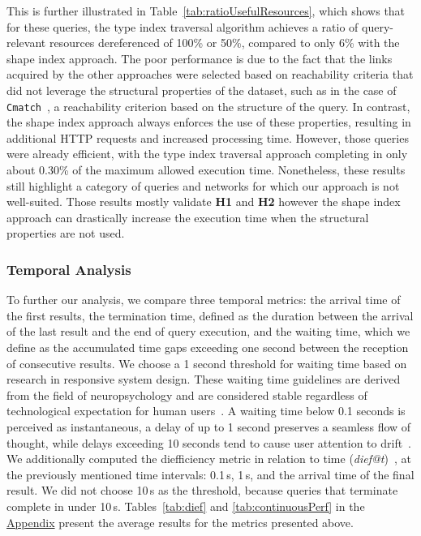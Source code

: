 This is further illustrated in Table~\ref{tab:ratioUsefulResources}, which shows that for these queries, the type index traversal algorithm achieves a ratio of query-relevant resources dereferenced of 100\% or 50\%, compared to only 6\% with the shape index approach.
The poor performance is due to the fact that the links acquired by the other approaches were selected based on reachability criteria that did not leverage the structural properties of the dataset, such as in the case of \texttt{Cmatch}~\cite{hartig2016walking}, a reachability criterion based on the structure of the query.
In contrast, the shape index approach always enforces the use of these properties, resulting in additional HTTP requests and increased processing time.
However, those queries were already efficient, with the type index traversal approach completing in only about 0.30\% of the maximum allowed execution time.
Nonetheless, these results still highlight a category of queries and networks for which our approach is not well-suited.
Those results mostly validate \textbf{H1} and \textbf{H2} however the shape index approach can drastically increase the execution time when the structural properties are not used.

 

\subsubsection{Temporal Analysis}
To further our analysis, we compare three temporal metrics: the arrival time of the first results, the termination time, defined as the duration between the arrival of the last result and the end of query execution, and the waiting time, which we define as the accumulated time gaps exceeding one second between the reception of consecutive results.
We choose a 1 second threshold for waiting time based on research in responsive system design.
These waiting time guidelines are derived from the field of neuropsychology and are considered stable regardless of technological expectation for human users~\cite{uxtigersNeedSpeed, Nielsen1993}.
A waiting time below 0.1 seconds is perceived as instantaneous, a delay of up to 1 second preserves a seamless flow of thought, while delays exceeding 10 seconds tend to cause user attention to drift~\cite{Nielsen1993}.
We additionally computed the diefficiency metric in relation to time (\textit{dief@t})~\cite{Acosta2017}, at the previously mentioned time intervals: 0.1\,s, 1\,s, and the arrival time of the final result.
We did not choose 10\,s as the threshold, because queries that terminate complete in under 10\,s.
Tables~\ref{tab:dief} and \ref{tab:continuousPerf} in the \hyperref[sec:appendix]{Appendix} present the average results for the metrics presented above.


